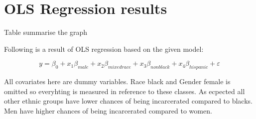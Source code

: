 \documentclass{article}
\begin{document}
\section{OLS Regression results}

Table summarise the graph



Following is a result of OLS regression based on the given model:

\begin{equation*}
    y = \beta_0 + x_1\beta_{male} + x_2\beta_{mixedrace} +x_3\beta_{nonblack} +x_4\beta_{hispanic} +\varepsilon
\end{equation*}

All covariates here are dummy variables. Race black and Gender female is omitted so everyhting is measured in reference to these classes. As ecpected all other ethnic groups have lower chances of being incarcerated compared to blacks. Men have higher chances of being incarcerated compared to women. 


\end{document}
